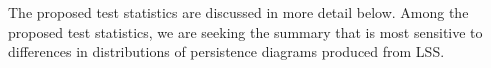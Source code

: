 \documentclass[12pt]{article}
\begin{document}
The proposed test statistics are discussed in more detail below.  Among the proposed test statistics, we are seeking the summary that is most sensitive to differences in distributions of persistence diagrams produced from LSS.





\end{document}
